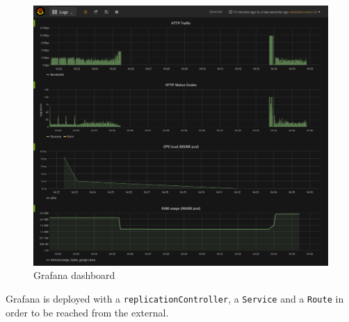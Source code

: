\begin{figure}[htbp]
\centering
\includegraphics{media/ch6-grafana.png}
\caption{Grafana dashboard}
\end{figure}

Grafana is deployed with a \texttt{replicationController}, a \texttt{Service} and a \texttt{Route} in order to be reached from the external.